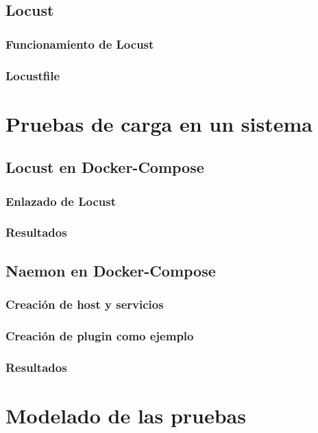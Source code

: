 \documentclass{beamer}
\theoremstyle{plain}
\theoremstyle{definition}
\theoremstyle{plain}
\theoremstyle{definition}
\theoremstyle{remark}
\theoremstyle{definition}
\begin{document}
\subsection{Locust}
\begin{frame}
	\frametitle{Funcionamiento de Locust}
	
\end{frame}
\begin{frame}
	\frametitle{Locustfile}
\end{frame}
\section{Pruebas de carga en un sistema} %


\subsection{Locust en Docker-Compose}
\begin{frame}
	\frametitle{Enlazado de Locust}
	
\end{frame}
\begin{frame}
	\frametitle{Resultados}
	\end{frame}
\subsection{Naemon en Docker-Compose}
\begin{frame}
	\frametitle{Creación de host y servicios}
	
\end{frame}
\begin{frame}
	\frametitle{Creación de plugin como ejemplo}
	
\end{frame}
\begin{frame}
	\frametitle{Resultados}
	\end{frame}


\section{Modelado de las pruebas} %
\end{document}
